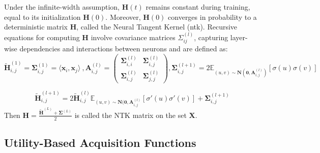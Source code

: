 Under the infinite-width assumption, \( \mathbf{H}(t) \) remains constant during training, equal to its initialization \( \mathbf{H}(0) \). Moreover, \( \mathbf{H}(0) \) converges in probability to a deterministic matrix \( \mathbf{H} \), called the Neural Tangent Kernel (\ac{ntk}). Recursive equations for computing \( \mathbf{H} \) involve covariance matrices \( \Sigma^{(l)}_{ij} \), capturing layer-wise dependencies and interactions between neurons and are defined as:
\[ \widetilde{\mathbf{H}}_{i,j}^{(1)} = \boldsymbol{\Sigma}_{i,j}^{(1)} = \langle \mathbf{x}_i, \mathbf{x}_j \rangle\ , \mathbf{A}_{i,j}^{(l)} = 
\begin{pmatrix}
\boldsymbol{\Sigma}_{i,i}^{(l)} & \boldsymbol{\Sigma}_{i,j}^{(l)} 
\\

\boldsymbol{\Sigma}_{i,j}^{(l)} & \boldsymbol{\Sigma}_{j,j}^{(l)}
\end{pmatrix}, 
\boldsymbol{\Sigma}_{i,j}^{(l+1)} = 2 \mathbb{E}_{(u,v) \sim \mathbf{N}(\mathbf{0}, \mathbf{A}_{i,j}^{(l)})} [\sigma(u) \sigma(v)] \]

\[ \widetilde{\mathbf{H}}_{i,j}^{(l+1)} = 2\widetilde{\mathbf{H}}_{i,j}^{(l)}\mathbb{E}_{(u,v) \sim \mathbf{N}(\mathbf{0}, \mathbf{A}_{i,j}^{(l)}} [\sigma'(u) \sigma'(v)] + \boldsymbol{\Sigma}_{i,j}^{(l+1)}\]
Then $\mathbf{H} = \frac{\mathbf{\widetilde{H}}^{(L)}+ \boldsymbol{\Sigma} ^ {(L)}}{2}$ is called the NTK matrix on the set $\mathbf{X} $. 








\subsection{Utility-Based Acquisition Functions}
\label{section:acquisition_functions}

